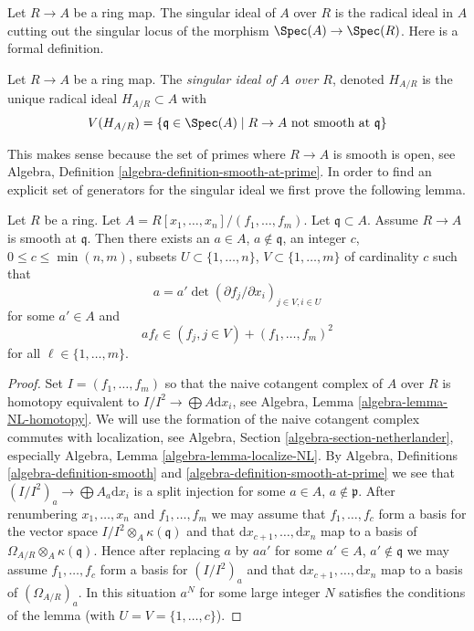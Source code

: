 \noindent
Let $R \to A$ be a ring map. The singular ideal of $A$ over $R$
is the radical ideal in $A$ cutting out the singular locus of the
morphism $\Spec(A) \to \Spec(R)$. Here is a formal definition.

\begin{definition}
\label{definition-singular-ideal}
Let $R \to A$ be a ring map. The {\it singular ideal of $A$ over $R$},
denoted $H_{A/R}$ is the unique radical ideal $H_{A/R} \subset A$ with
$$
V(H_{A/R}) = \{\mathfrak q \in \Spec(A) \mid R \to A
\text{ not smooth at }\mathfrak q\}
$$
\end{definition}

\noindent
This makes sense because the set of primes where $R \to A$ is smooth
is open, see
Algebra, Definition \ref{algebra-definition-smooth-at-prime}.
In order to find an explicit set
of generators for the singular ideal we first prove the following lemma.

\begin{lemma}
\label{lemma-find-strictly-standard}
Let $R$ be a ring. Let $A = R[x_1, \ldots, x_n]/(f_1, \ldots, f_m)$.
Let $\mathfrak q \subset A$. Assume $R \to A$ is smooth
at $\mathfrak q$. Then there exists an $a \in A$, $a \not \in \mathfrak q$,
an integer $c$, $0 \leq c \leq \min(n, m)$, subsets
$U \subset \{1, \ldots, n\}$, $V \subset \{1, \ldots, m\}$
of cardinality $c$ such that
$$
a = a' \det(\partial f_j/\partial x_i)_{j \in V, i \in U}
$$
for some $a' \in A$ and
$$
a f_\ell \in (f_j, j \in V) + (f_1, \ldots, f_m)^2
$$
for all $\ell \in \{1, \ldots, m\}$.
\end{lemma}

\begin{proof}
Set $I = (f_1, \ldots, f_m)$ so that the naive cotangent
complex of $A$ over $R$ is homotopy equivalent to
$I/I^2 \to \bigoplus A\text{d}x_i$, see
Algebra, Lemma \ref{algebra-lemma-NL-homotopy}.
We will use the formation of the naive cotangent complex commutes with
localization, see Algebra, Section \ref{algebra-section-netherlander},
especially Algebra, Lemma \ref{algebra-lemma-localize-NL}.
By Algebra, Definitions \ref{algebra-definition-smooth} and
\ref{algebra-definition-smooth-at-prime}
we see that $(I/I^2)_a \to \bigoplus A_a\text{d}x_i$
is a split injection for some $a \in A$, $a \not \in \mathfrak p$.
After renumbering $x_1, \ldots, x_n$ and $f_1, \ldots, f_m$ we may
assume that $f_1, \ldots, f_c$ form a basis for
the vector space $I/I^2 \otimes_A \kappa(\mathfrak q)$ and that
$\text{d}x_{c + 1}, \ldots, \text{d}x_n$ map to a basis of
$\Omega_{A/R} \otimes_A \kappa(\mathfrak q)$. Hence after replacing $a$
by $aa'$ for some $a' \in A$, $a' \not \in \mathfrak q$ we may assume
$f_1, \ldots, f_c$ form a basis for $(I/I^2)_a$ and that
$\text{d}x_{c + 1}, \ldots, \text{d}x_n$ map to a basis of
$(\Omega_{A/R})_a$. In this situation $a^N$ for some large integer
$N$ satisfies the conditions of the lemma (with $U = V = \{1, \ldots, c\}$).
\end{proof}

